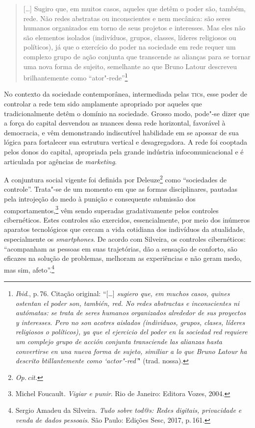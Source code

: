 \begin{quote}
{[}\ldots{}{]} Sugiro que, em muitos casos, aqueles que detêm o poder são,
também, rede. Não redes abstratas ou inconscientes e nem mecânica: são
seres humanos organizados em torno de seus projetos e interesses. Mas
eles não são elementos isolados (indivíduos, grupos, classes, líderes
religiosos ou políticos), já que o exercício do poder na sociedade em
rede requer um complexo grupo de ação conjunta que transcende as
alianças para se tornar uma nova forma de sujeito, semelhante ao que
Bruno Latour descreveu brilhantemente como ``ator"-rede''\footnote{\textit{Ibid}., p.\,76. Citação
  original: ``{[}\ldots{}{]} \textit{sugiero que, em muchos casos, quines ostentan el
        poder son, también, red. No redes abstractas e inconscientes ni
        autómatas: se trata de seres humanos organizados alrededor de sus
        proyectos y interesses. Pero no son acotres aislados (individuos,
        grupos, clases, líderes religiosos o políticos), ya que el ejercicio
        del poder en la sociedad red requiere um complejo grupo de acción
        conjunta transciende las alianzas hasta convertirse en una nueva forma
        de sujeto, similiar a lo que Bruno Latour ha descrito btillantemente
        como `actor"-red'}" (trad. nossa).}
\end{quote}

No contexto da sociedade contemporânea, intermediada pelas \textsc{tic}s, esse
poder de controlar a rede tem sido amplamente apropriado por aqueles que
tradicionalmente detêm o domínio na sociedade. Grosso modo, pode"-se
dizer que a força do capital desvendou as nuances dessa rede horizontal,
favorável à democracia, e vêm demonstrando indiscutível habilidade em se
apossar de sua lógica para fortalecer sua estrutura vertical e
desagregadora. A rede foi cooptada pelos donos do capital, apropriada
pela grande indústria infocomunicacional e é articulada por agências de
\textit{marketing}.

A conjuntura social vigente foi definida por Deleuze\footnote{\textit{Op.\,cit.}} como
``sociedades de controle''. Trata"-se de um momento em que as formas
disciplinares, pautadas pela introjeção do medo à punição e consequente
submissão dos comportamentos,\footnote{Michel Foucault. \textit{Vigiar e punir}. Rio de Janeiro: Editora Vozes, 2004.} vêm sendo superadas
gradativamente pelos controles cibernéticos. Estes controles são
exercidos, essencialmente, por meio dos inúmeros aparatos tecnológicos
que cercam a vida cotidiana dos indivíduos da atualidade, especialmente
os \textit{smartphones}. De acordo com Silveira, os
controles cibernéticos: ``acompanham as pessoas em suas trajetórias, dão
a sensação de conforto, são eficazes na solução de problemas, melhoram
as experiências e não geram medo, mas sim, afeto''.\footnote{Sergio Amadeu da Silveira. \textit{Tudo sobre tod@s: Redes digitais, privacidade e venda de dados pessoais}. São Paulo: Edições Sesc, 2017, p.\,161.}

